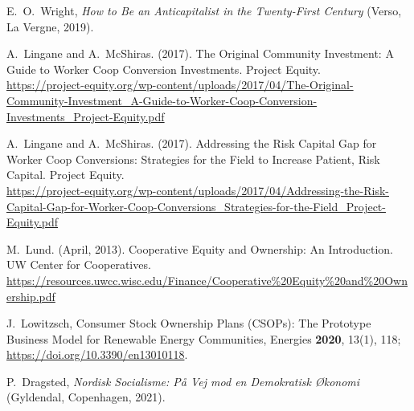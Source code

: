 \documentclass{article}
\begin{document}

\begin{thebibliography}{20}
	
	
	E.\ O.\ Wright, 
	\textit{ How to Be an Anticapitalist in the Twenty-First Century} 
	(Verso, La Vergne, 2019).
	
	
%	
%	
	
	
	A.\ Lingane and A.\ McShiras.
	(2017). 
	The Original Community Investment: A Guide to Worker Coop Conversion Investments.
	Project Equity.\\
	\url{https://project-equity.org/wp-content/uploads/2017/04/The-Original-Community-Investment_A-Guide-to-Worker-Coop-Conversion-Investments_Project-Equity.pdf}
	
	
	A.\ Lingane and A.\ McShiras.
	(2017). 
	Addressing the Risk Capital Gap for Worker Coop Conversions: Strategies for the Field to Increase Patient, Risk Capital.
	Project Equity.\\
	\url{https://project-equity.org/wp-content/uploads/2017/04/Addressing-the-Risk-Capital-Gap-for-Worker-Coop-Conversions\_Strategies-for-the-Field\_Project-Equity.pdf}
	
	
	M.\ Lund.
	(April, 2013). 
	Cooperative Equity and Ownership: An Introduction.
	UW Center for Cooperatives.\\
	\url{https://resources.uwcc.wisc.edu/Finance/Cooperative%20Equity%20and%20Ownership.pdf}
	
	
	J.\ Lowitzsch, Consumer Stock Ownership Plans (CSOPs): The Prototype Business Model for Renewable Energy Communities, 
	Energies \textbf{2020}, 13(1), 118; \url{https://doi.org/10.3390/en13010118}.
	
	P.\ Dragsted, 
	\textit{Nordisk Socialisme: På Vej mod en Demokratisk Økonomi} 
	(Gyldendal, Copenhagen, 2021).
	
	
	
\end{thebibliography}
\end{document}
